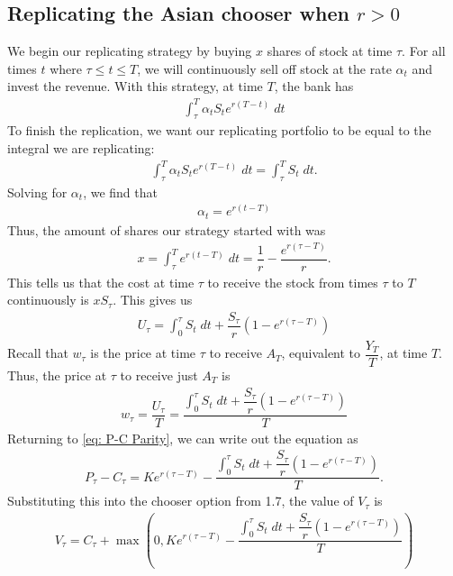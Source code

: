 \documentclass[reqno]{amsart}
\begin{document}
\subsection{Replicating the Asian chooser when $r > 0$}
We begin our replicating strategy by buying $x$ shares of stock at time $\tau$. For all times $t$ where $\tau \leq t \leq T$, we will continuously sell off stock at the rate $\alpha_t$ and invest the revenue.
With this strategy, at time $T$, the bank has 
\begin{align}
     \int_\tau^T \alpha_t S_t e^{r(T-t)} \; dt
\end{align}
To finish the replication, we want our replicating portfolio to be equal to the integral we are replicating:
\begin{align}
     \int_\tau^T \alpha_t S_t e^{r(T-t)} \; dt = \int_\tau^T S_t \; dt.
\end{align}
Solving for $\alpha_t$, we find that
\begin{align}
     \alpha_t = e^{r(t-T)}
\end{align}
Thus, the amount of shares our strategy started with was
\begin{align}
     x = \int_\tau^T e^{r(t-T)} \; dt = \dfrac{1}{r} - \dfrac{e^{r(\tau - T)}}{r}.
\end{align}
This tells us that the cost at time $\tau$ to receive the stock from times $\tau$ to $T$ continuously is $x S_\tau$. This gives us 
\begin{align}
     U_\tau = \int_0^\tau S_t \; dt + \dfrac{S_\tau}{r}\left( 1 - e^{r(\tau - T)} \right)
\end{align}
Recall that $w_\tau$ is the price at time $\tau$ to receive $A_T$, equivalent to $\dfrac{Y_T}{T}$, at time $T$.
Thus, the price at $\tau$ to receive just $A_T$ is 
\begin{align}
     w_\tau = \dfrac{U_\tau}{T} = \dfrac{\int_0^\tau S_t \; dt + \dfrac{S_\tau}{r}\left( 1 - e^{r(\tau - T)} \right)}{T}
\end{align}
Returning to \eqref{eq: P-C Parity}, we can write out the equation as
\begin{align}
     P_\tau - C_\tau = Ke^{r(\tau - T)} - \dfrac{\int_0^\tau S_t \; dt + \dfrac{S_\tau}{r}\left( 1 - e^{r(\tau - T)} \right)}{T}.
\end{align}
Substituting this into the chooser option from 1.7, the value of $V_\tau$ is
\begin{align}
     V_\tau = C_\tau + \max(0, Ke^{r(\tau - T)} - \dfrac{\int_0^\tau S_t \; dt + \dfrac{S_\tau}{r}\left( 1 - e^{r(\tau - T)} \right)}{T})
\end{align}
\end{document}
